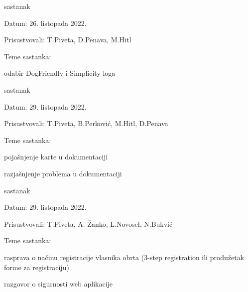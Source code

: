 \begin{packed_enum}
			\item  sastanak
			\item[] \begin{packed_item}
				\item Datum: 26. listopada 2022.
				\item Prisustvovali: T.Piveta, D.Penava, M.Hitl
				\item Teme sastanka:
				\begin{packed_item}
				    \item  odabir DogFriendly i Simplicity loga
				\end{packed_item}
			\end{packed_item}
			
			\item  sastanak
			\item[] \begin{packed_item}
				\item Datum: 29. listopada 2022.
				\item Prisustvovali: T.Piveta, B.Perković, M.Hitl, D.Penava
				\item Teme sastanka:
				\begin{packed_item}
				    \item pojašnjenje karte u dokumentaciji
				    \item razjašnjenje problema u dokumentaciji
				\end{packed_item}
			\end{packed_item}
			
			\item  sastanak
			\item[] \begin{packed_item}
				\item Datum: 29. listopada 2022.
				\item Prisustvovali: T.Piveta, A. Žanko, L.Novosel, N.Bukvić
				\item Teme sastanka:
				\begin{packed_item}
				    \item rasprava o načinu registracije vlasnika obrta (3-step registration ili produžetak forme za registraciju)
                    \item razgovor o sigurnosti web aplikacije

				\end{packed_item}
			\end{packed_item}
			

\end{packed_enum}

